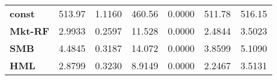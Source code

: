 \begin{center}
\begin{tabular}{lcccccc}
\midrule
\textbf{const}  &       513.97       &       1.1160       &      460.56     &      0.0000      &       511.78      &       516.15       \\
\textbf{Mkt-RF} &       2.9933       &       0.2597       &      11.528     &      0.0000      &       2.4844      &       3.5023       \\
\textbf{SMB}    &       4.4845       &       0.3187       &      14.072     &      0.0000      &       3.8599      &       5.1090       \\
\textbf{HML}    &       2.8799       &       0.3230       &      8.9149     &      0.0000      &       2.2467      &       3.5131       \\
\bottomrule
\end{tabular}
\end{center}
